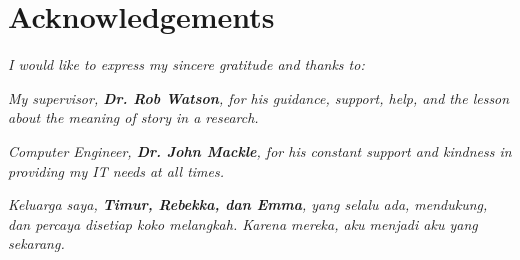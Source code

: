 \newpage
\centering
\section*{Acknowledgements} 

\vspace{6cm}
\textit{I would like to express my sincere gratitude and thanks to:}

\vspace{1cm}

\textit{My supervisor, \textbf{Dr. Rob Watson}, for his guidance, support, help, and the lesson about the meaning of story in a research.}

\textit{Computer Engineer, \textbf{Dr. John Mackle}, for his constant support and kindness in providing my IT needs at all times.}

\textit{Keluarga saya, \textbf{Timur, Rebekka, dan Emma}, yang selalu ada, mendukung, dan percaya disetiap koko melangkah. Karena mereka, aku menjadi aku yang sekarang.}






